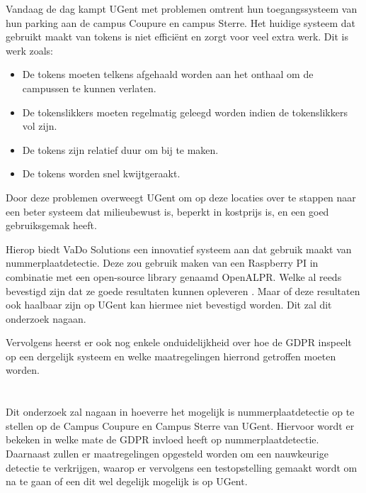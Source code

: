 Vandaag de dag kampt UGent met problemen omtrent hun toegangssysteem van hun parking aan de campus Coupure en campus Sterre. Het huidige systeem dat gebruikt maakt van tokens is niet efficiënt en zorgt voor veel extra werk. Dit is werk zoals:
\begin{itemize}
	\item De tokens moeten telkens afgehaald worden aan het onthaal om de campussen te kunnen verlaten.
	\item De tokenslikkers moeten regelmatig geleegd worden indien de tokenslikkers vol zijn.
	\item De tokens zijn relatief duur om bij te maken.
	\item De tokens worden snel kwijtgeraakt.
\end{itemize}
Door deze problemen overweegt UGent om op deze locaties over te stappen naar een beter systeem dat milieubewust is, beperkt in kostprijs is, en een goed gebruiksgemak heeft. 

Hierop biedt VaDo Solutions een innovatief systeem aan dat gebruik maakt van nummerplaatdetectie. Deze zou gebruik maken van een Raspberry PI in combinatie met een open-source library genaamd OpenALPR. Welke al reeds bevestigd zijn dat ze goede resultaten kunnen opleveren \autocite{figuerola2016automated}. Maar of deze resultaten ook haalbaar zijn op UGent kan hiermee niet bevestigd worden. Dit zal dit onderzoek nagaan.

Vervolgens heerst er ook nog enkele onduidelijkheid over hoe de GDPR inspeelt op een dergelijk systeem en welke maatregelingen hierrond getroffen moeten worden.

\section{}
\label{sec:onderzoeksvraag}

Dit onderzoek zal nagaan in hoeverre het mogelijk is nummerplaatdetectie op te stellen op de Campus Coupure en Campus Sterre van UGent. Hiervoor wordt er bekeken in welke mate de GDPR invloed heeft op nummerplaatdetectie. Daarnaast zullen er maatregelingen opgesteld worden om een nauwkeurige detectie te verkrijgen, waarop er vervolgens een testopstelling gemaakt wordt om na te gaan of een dit wel degelijk mogelijk is op UGent.

